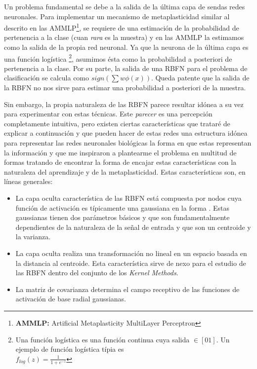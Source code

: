 \documentclass[10pt,a4paper]{report}
\begin{document}
Un problema fundamental se debe a la salida de la última capa de sendas redes neuronales. Para implementar un mecanismo de metaplasticidad similar al descrito en las AMMLP\footnote{\textbf{AMMLP:} Artificial Metaplasticity MultiLayer Perceptron}\cite{Andina2009}, se requiere de una estimación de la probabilidad de pertenencia a la clase (cuan \textit{rara} es la muestra) y en las AMMLP la estimamos como la salida de la propia red neuronal. Ya que la neurona de la última capa es una función logística \footnote{Una función logística es una función continua cuya salida $\in [0 1]$. Un ejemplo de función logística típia es \\ $f_{log}(z)=\frac{1}{1+e^{-z}}$}, asumimos ésta como la probabilidad a posteriori de pertenencia a la clase. Por su parte, la salida de una RBFN para el problema de clasificación se calcula como $sign(\sum w \phi(x))$. Queda patente que la salida de la RBFN no nos sirve para estimar una probabilidad a posteriori de la muestra.

Sin embargo, la propia naturaleza de las RBFN parece resultar idónea a su vez para experimentar con estas técnicas. Este \textit{parecer} es una percepción completamente intuitiva, pero existen ciertas características que trataré de explicar a continuación y que pueden hacer de estas redes una estructura idónea para representar las redes neuronales biológicas la forma en que estas representan la información y que me inspiraron a plantearme el problema en multitud de formas tratando de encontrar la forma de encajar estas características con la naturaleza del aprendizaje y de la metaplasticidad. Estas características son, en líneas generales:

\begin{itemize}
	\item La capa oculta característica de las RBFN está compuesta por nodos cuya función de activación es típicamente una gaussiana en la forma . Estas gaussianas tienen dos parámetros básicos y que son fundamentalmente dependientes de la naturaleza de la señal de entrada y que son un centroide y la varianza.
	\item La capa oculta realiza una transformación no lineal en un espacio basada en la distancia al centroide. Esta característica sirve de nexo para el estudio de las RBFN dentro del conjunto de los \textit{Kernel Methods}.
	\item La matriz de covarianza determina el campo receptivo de las funciones de activación de base radial gaussianas.
\end{itemize}
\end{document}
